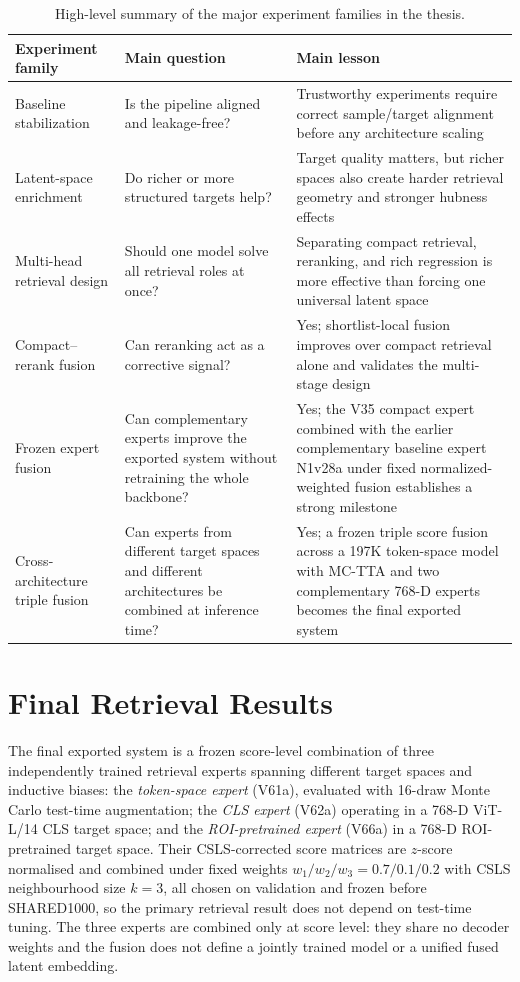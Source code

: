 \begin{table}[htbp]
\centering
\small
\begin{tabularx}{\textwidth}{>{\raggedright\arraybackslash}p{2.7cm} >{\raggedright\arraybackslash}p{3.4cm} >{\raggedright\arraybackslash}X}
\toprule
\textbf{Experiment family} & \textbf{Main question} & \textbf{Main lesson} \\
\midrule
Baseline stabilization & Is the pipeline aligned and leakage-free? & Trustworthy experiments require correct sample/target alignment before any architecture scaling \\
Latent-space enrichment & Do richer or more structured targets help? & Target quality matters, but richer spaces also create harder retrieval geometry and stronger hubness effects \\
Multi-head retrieval design & Should one model solve all retrieval roles at once? & Separating compact retrieval, reranking, and rich regression is more effective than forcing one universal latent space \\
Compact--rerank fusion & Can reranking act as a corrective signal? & Yes; shortlist-local fusion improves over compact retrieval alone and validates the multi-stage design \\
Frozen expert fusion & Can complementary experts improve the exported system without retraining the whole backbone? & Yes; the V35 compact expert combined with the earlier complementary baseline expert N1v28a under fixed normalized-weighted fusion establishes a strong milestone \\
Cross-architecture triple fusion & Can experts from different target spaces and different architectures be combined at inference time? & Yes; a frozen triple score fusion across a 197K token-space model with MC-TTA and two complementary 768-D experts becomes the final exported system \\
\bottomrule
\end{tabularx}
\caption{High-level summary of the major experiment families in the thesis.}
\label{tab:experimental_waves}
\end{table}

\section{Final Retrieval Results}

The final exported system is a frozen score-level combination of three independently trained retrieval experts spanning different target spaces and inductive biases: the \emph{token-space expert} (V61a), evaluated with 16-draw Monte Carlo test-time augmentation; the \emph{CLS expert} (V62a) operating in a 768-D ViT-L/14 CLS target space; and the \emph{ROI-pretrained expert} (V66a) in a 768-D ROI-pretrained target space. Their CSLS-corrected score matrices are $z$-score normalised and combined under fixed weights $w_1/w_2/w_3 = 0.7/0.1/0.2$ with CSLS neighbourhood size $k=3$, all chosen on validation and frozen before SHARED1000, so the primary retrieval result does not depend on test-time tuning. The three experts are combined only at score level: they share no decoder weights and the fusion does not define a jointly trained model or a unified fused latent embedding.

